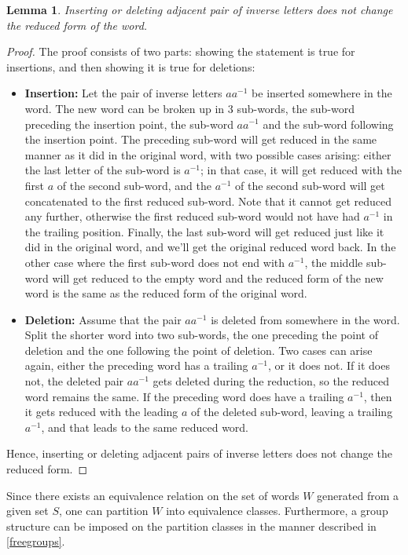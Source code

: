 \documentclass[12pt, titlepage]{article}
\newtheorem{lem}[thm]{Lemma}
\theoremstyle{definition}
\begin{document}
\begin{lem}
Inserting or deleting adjacent pair of inverse letters does not change the reduced form of the word.
\end{lem}

\begin{proof}
The proof consists of two parts: showing the statement is true for insertions, and then showing it is true for deletions:
\begin{itemize}
\item \textbf{Insertion:} Let the pair of inverse letters $aa^{-1}$ be inserted somewhere in the word. The new word can be broken up in 3 sub-words, the sub-word preceding the insertion point, the sub-word $aa^{-1}$ and the sub-word following the insertion point. The preceding sub-word will get reduced in the same manner as it did in the original word, with two possible cases arising: either the last letter of the sub-word is $a^{-1}$; in that case, it will get reduced with the first $a$ of the second sub-word, and the $a^{-1}$ of the second sub-word will get concatenated to the first reduced sub-word. Note that it cannot get reduced any further, otherwise the first reduced sub-word would not have had $a^{-1}$ in the trailing position. Finally, the last sub-word will get reduced just like it did in the original word, and we'll get the original reduced word back. In the other case where the first sub-word does not end with $a^{-1}$, the middle sub-word will get reduced to the empty word and the reduced form of the new word is the same as the reduced form of the original word.
\item \textbf{Deletion:} Assume that the pair $aa^{-1}$ is deleted from somewhere in the word. Split the shorter word into two sub-words, the one preceding the point of deletion and the one following the point of deletion. Two cases can arise again, either the preceding word has a trailing $a^{-1}$, or it does not. If it does not, the deleted pair $aa^{-1}$ gets deleted during the reduction, so the reduced word remains the same. If the preceding word does have a trailing $a^{-1}$, then it gets reduced with the leading $a$ of the deleted sub-word, leaving a trailing $a^{-1}$, and that leads to the same reduced word. 
\end{itemize}
Hence, inserting or deleting adjacent pairs of inverse letters does not change the reduced form.
\end{proof}

Since there exists an equivalence relation on the set of words $W$ generated from a given set $S$, one can partition $W$ into equivalence classes. Furthermore, a group structure can be imposed on the partition classes in the manner described in \autoref{freegroups}.
\end{document}
